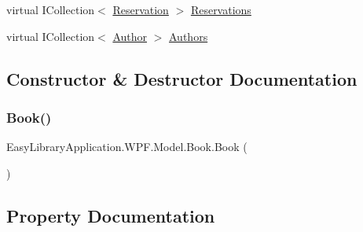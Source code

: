 \begin{DoxyCompactItemize}
\item 
virtual I\+Collection$<$ \mbox{\hyperlink{class_easy_library_application_1_1_w_p_f_1_1_model_1_1_reservation}{Reservation}} $>$ \mbox{\hyperlink{class_easy_library_application_1_1_w_p_f_1_1_model_1_1_book_a41207622c9e74ff8f5bf57f7f8f2f393}{Reservations}}
\item 
virtual I\+Collection$<$ \mbox{\hyperlink{class_easy_library_application_1_1_w_p_f_1_1_model_1_1_author}{Author}} $>$ \mbox{\hyperlink{class_easy_library_application_1_1_w_p_f_1_1_model_1_1_book_a175b50556d5ccf5ed44046ae7ae87555}{Authors}}
\end{DoxyCompactItemize}


\subsection{Constructor \& Destructor Documentation}
\mbox{\label{class_easy_library_application_1_1_w_p_f_1_1_model_1_1_book_afd8540d25bc43963b2820d4e885dd36e}} 
\subsubsection{\texorpdfstring{Book()}{Book()}}
{\footnotesize\ttfamily Easy\+Library\+Application.\+W\+P\+F.\+Model.\+Book.\+Book (\begin{DoxyParamCaption}{ }\end{DoxyParamCaption})}



\subsection{Property Documentation}
\mbox{\label{class_easy_library_application_1_1_w_p_f_1_1_model_1_1_book_a175b50556d5ccf5ed44046ae7ae87555}} 
